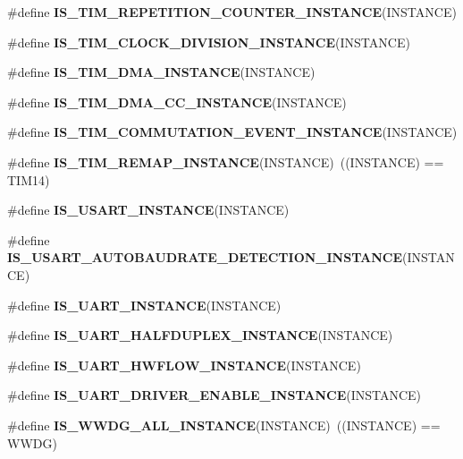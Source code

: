 \begin{DoxyCompactItemize}
\item 
\#define {\bfseries I\+S\+\_\+\+T\+I\+M\+\_\+\+R\+E\+P\+E\+T\+I\+T\+I\+O\+N\+\_\+\+C\+O\+U\+N\+T\+E\+R\+\_\+\+I\+N\+S\+T\+A\+N\+CE}(I\+N\+S\+T\+A\+N\+CE)
\item 
\#define {\bfseries I\+S\+\_\+\+T\+I\+M\+\_\+\+C\+L\+O\+C\+K\+\_\+\+D\+I\+V\+I\+S\+I\+O\+N\+\_\+\+I\+N\+S\+T\+A\+N\+CE}(I\+N\+S\+T\+A\+N\+CE)
\item 
\#define {\bfseries I\+S\+\_\+\+T\+I\+M\+\_\+\+D\+M\+A\+\_\+\+I\+N\+S\+T\+A\+N\+CE}(I\+N\+S\+T\+A\+N\+CE)
\item 
\#define {\bfseries I\+S\+\_\+\+T\+I\+M\+\_\+\+D\+M\+A\+\_\+\+C\+C\+\_\+\+I\+N\+S\+T\+A\+N\+CE}(I\+N\+S\+T\+A\+N\+CE)
\item 
\#define {\bfseries I\+S\+\_\+\+T\+I\+M\+\_\+\+C\+O\+M\+M\+U\+T\+A\+T\+I\+O\+N\+\_\+\+E\+V\+E\+N\+T\+\_\+\+I\+N\+S\+T\+A\+N\+CE}(I\+N\+S\+T\+A\+N\+CE)
\item 
\mbox{\label{group___exported__macro_ga6bb03cf116b07bfe1bd527f8ab61a7f9}} 
\#define {\bfseries I\+S\+\_\+\+T\+I\+M\+\_\+\+R\+E\+M\+A\+P\+\_\+\+I\+N\+S\+T\+A\+N\+CE}(I\+N\+S\+T\+A\+N\+CE)~((I\+N\+S\+T\+A\+N\+CE) == T\+I\+M14)
\item 
\#define {\bfseries I\+S\+\_\+\+U\+S\+A\+R\+T\+\_\+\+I\+N\+S\+T\+A\+N\+CE}(I\+N\+S\+T\+A\+N\+CE)
\item 
\#define {\bfseries I\+S\+\_\+\+U\+S\+A\+R\+T\+\_\+\+A\+U\+T\+O\+B\+A\+U\+D\+R\+A\+T\+E\+\_\+\+D\+E\+T\+E\+C\+T\+I\+O\+N\+\_\+\+I\+N\+S\+T\+A\+N\+CE}(I\+N\+S\+T\+A\+N\+CE)
\item 
\#define {\bfseries I\+S\+\_\+\+U\+A\+R\+T\+\_\+\+I\+N\+S\+T\+A\+N\+CE}(I\+N\+S\+T\+A\+N\+CE)
\item 
\#define {\bfseries I\+S\+\_\+\+U\+A\+R\+T\+\_\+\+H\+A\+L\+F\+D\+U\+P\+L\+E\+X\+\_\+\+I\+N\+S\+T\+A\+N\+CE}(I\+N\+S\+T\+A\+N\+CE)
\item 
\#define {\bfseries I\+S\+\_\+\+U\+A\+R\+T\+\_\+\+H\+W\+F\+L\+O\+W\+\_\+\+I\+N\+S\+T\+A\+N\+CE}(I\+N\+S\+T\+A\+N\+CE)
\item 
\#define {\bfseries I\+S\+\_\+\+U\+A\+R\+T\+\_\+\+D\+R\+I\+V\+E\+R\+\_\+\+E\+N\+A\+B\+L\+E\+\_\+\+I\+N\+S\+T\+A\+N\+CE}(I\+N\+S\+T\+A\+N\+CE)
\item 
\mbox{\label{group___exported__macro_gac2a8aaec233e19987232455643a04d6f}} 
\#define {\bfseries I\+S\+\_\+\+W\+W\+D\+G\+\_\+\+A\+L\+L\+\_\+\+I\+N\+S\+T\+A\+N\+CE}(I\+N\+S\+T\+A\+N\+CE)~((I\+N\+S\+T\+A\+N\+CE) == W\+W\+DG)

\end{DoxyCompactItemize}
